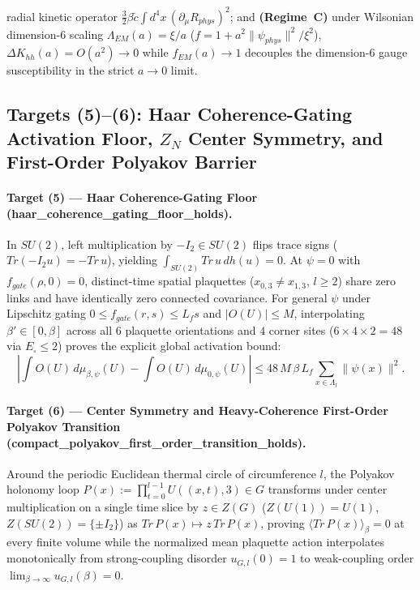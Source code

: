 \documentclass[american,11pt,letterpaper]{article}
\def\mathbb#1{#1}%
\def\mathbf#1{#1}%
\def\mathrm#1{#1}%
\def\texttt#1{#1}%
\begin{document}
radial kinetic operator $\frac{3}{2}\beta\tilde{c}\int d^4x\,(\partial_\mu R_{\mathrm{phys}})^2$; and \textbf{(Regime~C)} under Wilsonian dimension-$6$ scaling $\Lambda_{\mathrm{EM}}(a)=\xi/a$ ($f = 1 + a^2\|\psi_{\mathrm{phys}}\|^2/\xi^2$), $\Delta K_{hh}(a) = O(a^2)\to 0$ while $f_{\mathrm{EM}}(a)\to 1$ decouples the dimension-$6$ gauge susceptibility in the strict $a\to 0$ limit.

\subsection{Targets (5)--(6): Haar Coherence-Gating Activation Floor, $\mathbb{Z}_N$ Center Symmetry, and First-Order Polyakov Barrier}

\paragraph{Target (5) --- Haar Coherence-Gating Floor (\texttt{haar\_coherence\_gating\_floor\_holds}).}
In $SU(2)$, left multiplication by $-I_2 \in SU(2)$ flips trace signs ($\mathrm{Tr}(-I_2 u) = -\mathrm{Tr}\,u$), yielding $\int_{SU(2)}\mathrm{Tr}\,u\,dh(u) = 0$. At $\psi = 0$ with $f_{\mathrm{gate}}(\rho,0) = 0$, distinct-time spatial plaquettes ($x_{0,3} \ne x_{1,3}$, $l \ge 2$) share zero links and have identically zero connected covariance. For general $\psi$ under Lipschitz gating $0 \le f_{\mathrm{gate}}(r,s) \le L_f s$ and $|O(U)| \le M$, interpolating $\beta' \in [0,\beta]$ across all $6$ plaquette orientations and $4$ corner sites ($6 \times 4 \times 2 = 48$ via $E_\square \le 2$) proves the explicit global activation bound:
\begin{equation}
\left|\int O(U)\,d\mu_{\beta,\psi}(U) - \int O(U)\,d\mu_{0,\psi}(U)\right|
\le 48\,M\,\beta\,L_f\sum_{x\in\Lambda_l}\|\psi(x)\|^2.
\label{eq:haar_48_bound_sec53}
\end{equation}

\paragraph{Target (6) --- Center Symmetry and Heavy-Coherence First-Order Polyakov Transition (\texttt{compact\_polyakov\_first\_order\_transition\_holds}).}
Around the periodic Euclidean thermal circle of circumference $l$, the Polyakov holonomy loop $P(\mathbf{x}) := \prod_{t=0}^{l-1} U((\mathbf{x},t), 3) \in G$ transforms under center multiplication on a single time slice by $z \in Z(G)$ ($Z(U(1)) = U(1)$, $Z(SU(2)) = \{\pm I_2\}$) as $\mathrm{Tr}\,P(\mathbf{x}) \mapsto z\,\mathrm{Tr}\,P(\mathbf{x})$, proving $\langle\mathrm{Tr}\,P(\mathbf{x})\rangle_{\beta} = 0$ at every finite volume while the normalized mean plaquette action interpolates monotonically from strong-coupling disorder $u_{G,l}(0) = 1$ to weak-coupling order $\lim_{\beta\to\infty} u_{G,l}(\beta) = 0$.
\end{document}
